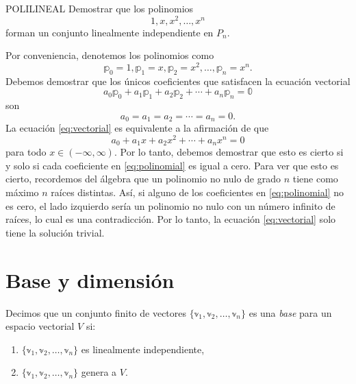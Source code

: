 \newpage

\begin{examplebox}{}{POLILINEAL}
    Demostrar que los polinomios
    $$1, x, x^2, \dots, x^n$$
    forman un conjunto linealmente independiente en $P_n$.

    \tcblower
    \solucion Por conveniencia, denotemos los polinomios como
    $$\mathbb{p}_0 = 1, \mathbb{p}_1 = x, \mathbb{p}_2 = x^2, \dots, \mathbb{p}_n = x^n.$$
    Debemos demostrar que los únicos coeficientes que satisfacen la ecuación vectorial
    \begin{equation}
        a_0\mathbb{p}_0 + a_1\mathbb{p}_1 + a_2\mathbb{p}_2 + \cdots + a_n\mathbb{p}_n = \mathbb{0} \label{eq:vectorial}
    \end{equation}
    son
    $$a_0 = a_1 = a_2 = \cdots = a_n = 0.$$
    La ecuación \eqref{eq:vectorial} es equivalente a la afirmación de que
    \begin{equation}
        a_0 + a_1x + a_2x^2 + \cdots + a_nx^n = 0 \label{eq:polinomial}
    \end{equation}
    para todo $x \in (-\infty, \infty)$. Por lo tanto, debemos demostrar que esto es cierto si y solo si cada coeficiente en \eqref{eq:polinomial} es igual a cero. Para ver que esto es cierto, recordemos del álgebra que un polinomio no nulo de grado $n$ tiene como máximo $n$ raíces distintas. Así, si alguno de los coeficientes en \eqref{eq:polinomial} no es cero, el lado izquierdo sería un polinomio no nulo con un número infinito de raíces, lo cual es una contradicción. Por lo tanto, la ecuación \eqref{eq:vectorial} solo tiene la solución trivial.
\end{examplebox}

\section{Base y dimensión}

\begin{definicion}{}{}
    Decimos que un conjunto finito de vectores $\{ \mathbb{v}_1, \mathbb{v}_2, \dots, \mathbb{v}_n \}$ es una \emph{base} para un espacio vectorial $V$ si:
    \begin{enumerate}[label=\roman*), topsep=6pt, itemsep=0pt]
        \item $\{ \mathbb{v}_1, \mathbb{v}_2, \dots, \mathbb{v}_n \}$ es linealmente independiente,
        \item $\{ \mathbb{v}_1, \mathbb{v}_2, \dots, \mathbb{v}_n \}$ genera a $V$.
    \end{enumerate}
\end{definicion}

